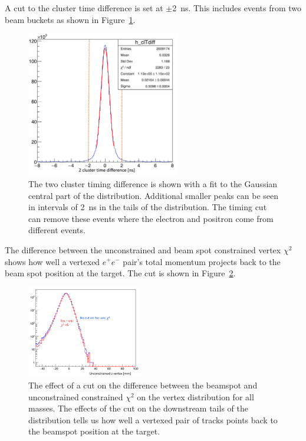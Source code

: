 A cut to the cluster time difference is set at $\pm$2~ns. This includes events from two beam buckets as shown in Figure~\ref{fig:cltdiff}.

\begin{figure}[H]
  \centering
      \includegraphics[width=0.6\textwidth]{pics/searching/cltdiff.png}
  \caption[Cut on the cluster pair time difference]{The two cluster timing difference is shown with a fit to the Gaussian central part of the distribution. Additional smaller peaks can be seen in intervals of 2~ns in the tails of the distribution. The timing cut can remove these events where the electron and positron come from different events.}
  \label{fig:cltdiff}
\end{figure} 

The difference between the unconstrained and beam spot constrained vertex $\chi^2$ shows how well a vertexed $e^+e^-$ pair's total momentum projects back to the beam spot position at the target. The cut is shown in Figure~\ref{fig:bmucut}.

\begin{figure}[H]
  \centering
      \includegraphics[width=0.45\textwidth]{pics/searching/bmuchi2.png}
  \caption[Vertex cut on the difference between beamspot and unconstrained $\chi^2$]{The effect of a cut on the difference between the beamspot and unconstrained constrained $\chi^2$ on the vertex distribution for all masses. The effects of the cut on the downstream tails of the distribution tells us how well a vertexed pair of tracks points back to the beamspot position at the target.}
  \label{fig:bmucut}
\end{figure} 

